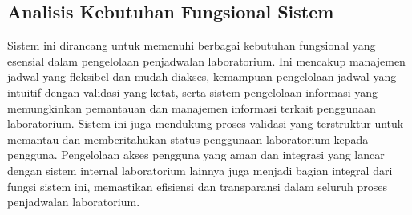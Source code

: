 \subsection{Analisis Kebutuhan Fungsional Sistem}
Sistem ini dirancang untuk memenuhi berbagai kebutuhan fungsional yang esensial dalam pengelolaan penjadwalan laboratorium. Ini mencakup manajemen jadwal yang fleksibel dan mudah diakses, kemampuan pengelolaan jadwal yang intuitif dengan validasi yang ketat, serta sistem pengelolaan informasi yang memungkinkan pemantauan dan manajemen informasi terkait penggunaan laboratorium. Sistem ini juga mendukung proses validasi yang terstruktur  untuk memantau dan memberitahukan status penggunaan laboratorium kepada pengguna. Pengelolaan akses pengguna yang aman dan integrasi yang lancar dengan sistem internal laboratorium lainnya juga menjadi bagian integral dari fungsi sistem ini, memastikan efisiensi dan transparansi dalam seluruh proses penjadwalan laboratorium.

